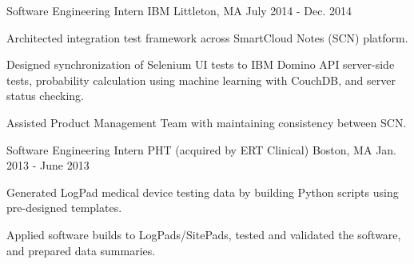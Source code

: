 \begin{cventries}
\vspace{5mm}
  \cventry
    {Software Engineering Intern} %
    {IBM} %
    {Littleton, MA} %
    {July 2014 - Dec. 2014} %
    {
      \begin{cvitems} %
        \item {Architected integration test framework across SmartCloud Notes (SCN) platform.}
        \item {Designed synchronization of Selenium UI tests to IBM Domino API server-side tests, probability calculation using machine learning with CouchDB, and server status checking.}
        \item {Assisted Product Management Team with maintaining consistency between SCN.}
      \end{cvitems}
    }

\vspace{5mm}
  \cventry
    {Software Engineering Intern} %
    {PHT (acquired by ERT Clinical)} %
    {Boston, MA} %
    {Jan. 2013 - June 2013} %
    {
      \begin{cvitems} %
        \item {Generated LogPad medical device testing data by building Python scripts using pre-designed templates.}
        \item {Applied software builds to LogPads/SitePads, tested and validated the software, and prepared data summaries.}
      \end{cvitems}
    }

\end{cventries}